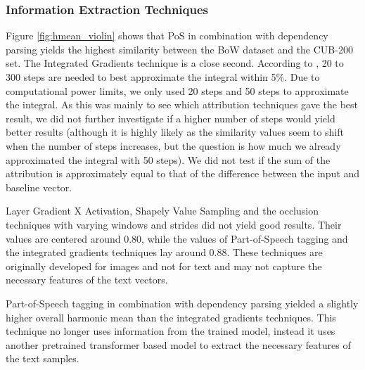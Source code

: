 \documentclass[a4paper, 12pt, oneside]{book} %
\begin{document}
\subsubsection{Information Extraction Techniques}
Figure \ref{fig:hmean_violin} shows that PoS in combination with dependency parsing yields the highest similarity between the BoW dataset and the CUB-200 set.
The Integrated Gradients technique is a close second. 
According to \textcite{sundararajan_axiomatic_2017}, 20 to 300 steps are needed to best approximate the integral within 5\%.
Due to computational power limits, we only used 20 steps and 50 steps to approximate the integral.
As this was mainly to see which attribution techniques gave the best result, we did not further investigate if a higher number of steps would yield better results (although it is highly likely as the similarity values seem to shift when the number of steps increases, but the question is how much we already approximated the integral with 50 steps).
We did not test if the sum of the attribution is approximately equal to that of the difference between the input and baseline vector.

Layer Gradient X Activation, Shapely Value Sampling and the occlusion techniques with varying windows and strides did not yield good results. 
Their values are centered around 0.80, while the values of Part-of-Speech tagging and the integrated gradients techniques lay around 0.88.
These techniques are originally developed for images and not for text and may not capture the necessary features of the text vectors.

Part-of-Speech tagging in combination with dependency parsing yielded a slightly higher overall harmonic mean than the integrated gradients techniques.
This technique no longer uses information from the trained model, instead it uses another pretrained transformer based model to extract the necessary features of the text samples.
\end{document}
